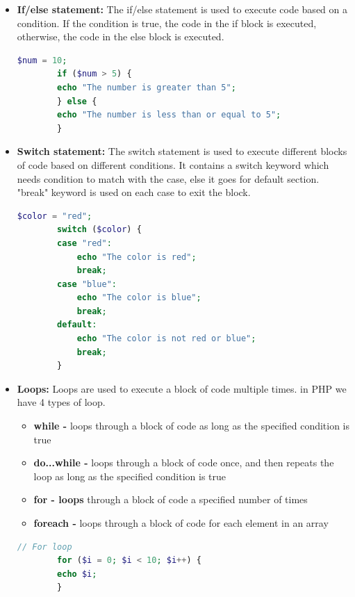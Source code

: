 \documentclass[11pt]{article}
\begin{document}
\begin{itemize}
    \item \textbf{If/else statement:}
    The if/else statement is used to execute code based on a condition. If the condition is true, the code in the if block is executed, otherwise, the code in the else block is executed.
    
    \begin{lstlisting}[language=php]
        $num = 10;
        if ($num > 5) {
        echo "The number is greater than 5";
        } else {
        echo "The number is less than or equal to 5";
        }
    \end{lstlisting}

    \item \textbf{Switch statement:}
    The switch statement is used to execute different blocks of code based on different conditions.
    It contains a switch keyword which needs condition to match with the case, else it goes for default  section. "break" keyword is used on each case to exit the block.
    \begin{lstlisting}[language=php]
        $color = "red";
        switch ($color) {
        case "red":
            echo "The color is red";
            break;
        case "blue":
            echo "The color is blue";
            break;
        default:
            echo "The color is not red or blue";
            break;
        }

    \end{lstlisting}
    
    \item \textbf{Loops:}
    Loops are used to execute a block of code multiple times. in PHP we have 4 types of loop.
    \begin{itemize}
        
        \item \textbf{while -} loops through a block of code as long as the specified condition is true
        \item \textbf{do...while -} loops through a block of code once, and then repeats the loop as long as the specified condition is true
        \item \textbf{for - loops} through a block of code a specified number of times
        \item \textbf{foreach -} loops through a block of code for each element in an array
     
    \end{itemize}
    \begin{lstlisting}[language=php]
        // For loop
        for ($i = 0; $i < 10; $i++) {
        echo $i;
        }


\end{lstlisting}
\end{itemize}
\end{document}
